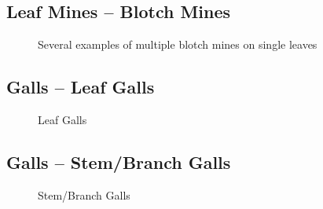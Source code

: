 \documentclass[
  letterpaper,
  DIV=11,
  numbers=noendperiod]{scrreprt}
\begin{document}
\subsection{Leaf Mines -- Blotch Mines}\label{leaf-mines-blotch-mines}

\begin{figure}


\caption{\label{fig-mines2}Several examples of multiple blotch mines on
single leaves}

\end{figure}%

\subsection{Galls -- Leaf Galls}\label{galls-leaf-galls}

\begin{figure}


\caption{\label{fig-galls1}Leaf Galls}

\end{figure}%

\subsection{Galls -- Stem/Branch Galls}\label{galls-stembranch-galls}

\begin{figure}


\caption{\label{fig-galls2}Stem/Branch Galls}

\end{figure}%
\end{document}
